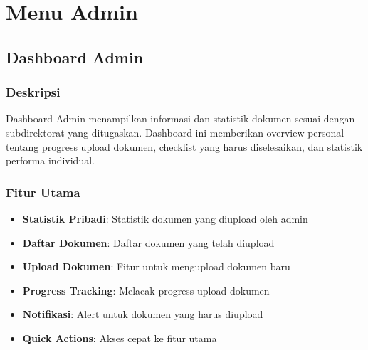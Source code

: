 \documentclass[12pt,a4paper]{article}
\begin{document}
\section{Menu Admin}

\subsection{Dashboard Admin}

\subsubsection{Deskripsi}
Dashboard Admin menampilkan informasi dan statistik dokumen sesuai dengan subdirektorat yang ditugaskan. Dashboard ini memberikan overview personal tentang progress upload dokumen, checklist yang harus diselesaikan, dan statistik performa individual.

\subsubsection{Fitur Utama}
\begin{itemize}
\item \textbf{Statistik Pribadi}: Statistik dokumen yang diupload oleh admin
\item \textbf{Daftar Dokumen}: Daftar dokumen yang telah diupload
\item \textbf{Upload Dokumen}: Fitur untuk mengupload dokumen baru
\item \textbf{Progress Tracking}: Melacak progress upload dokumen
\item \textbf{Notifikasi}: Alert untuk dokumen yang harus diupload
\item \textbf{Quick Actions}: Akses cepat ke fitur utama
\end{itemize}
\end{document}
